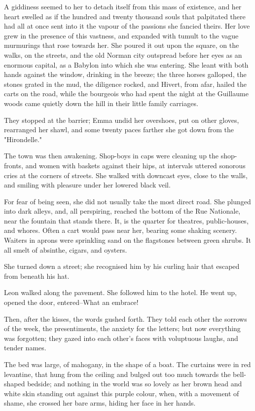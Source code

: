 \documentclass{tufte-book}
\begin{document}
A giddiness seemed to her to detach itself from this mass of existence,
and her heart swelled as if the hundred and twenty thousand souls that
palpitated there had all at once sent into it the vapour of the passions
she fancied theirs. Her love grew in the presence of this vastness, and
expanded with tumult to the vague murmurings that rose towards her. She
poured it out upon the square, on the walks, on the streets, and the
old Norman city outspread before her eyes as an enormous capital, as a
Babylon into which she was entering. She leant with both hands against
the window, drinking in the breeze; the three horses galloped, the
stones grated in the mud, the diligence rocked, and Hivert, from afar,
hailed the carts on the road, while the bourgeois who had spent the
night at the Guillaume woods came quietly down the hill in their little
family carriages.

They stopped at the barrier; Emma undid her overshoes, put on other
gloves, rearranged her shawl, and some twenty paces farther she got down
from the "Hirondelle."

The town was then awakening. Shop-boys in caps were cleaning up the
shop-fronts, and women with baskets against their hips, at intervals
uttered sonorous cries at the corners of streets. She walked with
downcast eyes, close to the walls, and smiling with pleasure under her
lowered black veil.

For fear of being seen, she did not usually take the most direct road.
She plunged into dark alleys, and, all perspiring, reached the bottom
of the Rue Nationale, near the fountain that stands there. It, is the
quarter for theatres, public-houses, and whores. Often a cart would
pass near her, bearing some shaking scenery. Waiters in aprons were
sprinkling sand on the flagstones between green shrubs. It all smelt of
absinthe, cigars, and oysters.

She turned down a street; she recognised him by his curling hair that
escaped from beneath his hat.

Leon walked along the pavement. She followed him to the hotel. He went
up, opened the door, entered--What an embrace!

Then, after the kisses, the words gushed forth. They told each other the
sorrows of the week, the presentiments, the anxiety for the letters; but
now everything was forgotten; they gazed into each other's faces with
voluptuous laughs, and tender names.

The bed was large, of mahogany, in the shape of a boat. The curtains
were in red levantine, that hung from the ceiling and bulged out too
much towards the bell-shaped bedside; and nothing in the world was so
lovely as her brown head and white skin standing out against this purple
colour, when, with a movement of shame, she crossed her bare arms,
hiding her face in her hands.
\end{document}
